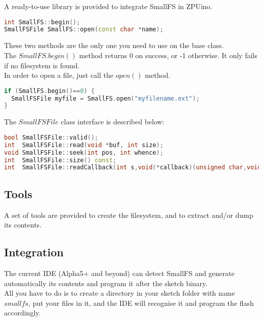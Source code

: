 A ready-to-use library is provided to integrate SmallFS in ZPUino.

\begin{lstlisting}[language=C++]
int SmallFS::begin();
SmallFSFile SmallFS::open(const char *name);
\end{lstlisting}

These two methods are the only one you need to use on the base class.\\
The $SmallFS.begin()$ method returns 0 on success, or
-1 otherwise. It only fails if no filesystem is found.\\

In order to open a file, just call the $open()$ method.

\begin{lstlisting}[language=C++]
if (SmallFS.begin()==0) {
  SmallFSFile myfile = SmallFS.open("myfilename.ext");
}
\end{lstlisting}
The $SmallFSFile$ class interface is described below:


\begin{lstlisting}[language=C++]
bool SmallFSFile::valid();
int  SmallFSFile::read(void *buf, int size);
void SmallFSFile::seek(int pos, int whence);
int  SmallFSFile::size() const;
int  SmallFSFile::readCallback(int s,void(*callback)(unsigned char,void*),void *data);
\end{lstlisting}

\subsection{Tools}
A set of tools are provided to create the filesystem, and to extract and/or dump its contents.

\subsection{Integration}
The current IDE (Alpha5+ and beyond) can detect SmallFS and generate automatically its contents and program it after
the sketch binary.\\
All you have to do is to create a directory in your sketch folder with name $smallfs$, put your files
in it, and the IDE will recognise it and program the flash accordingly.


